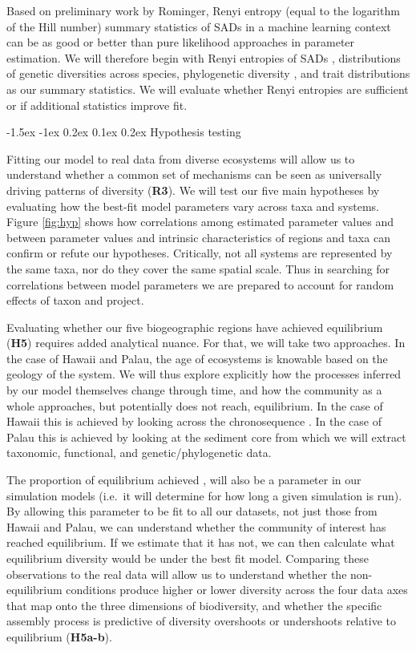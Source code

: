 \documentclass[11pt]{article}
\makeatletter
\renewcommand\subsubsection{\@startsection{subsection}{1}{\z@}%
                                  {-1.5ex \@plus -1ex \@minus 0.2ex}%
                                  {0.1ex \@plus 0.2ex}%
                                  {\normalfont\bfseries}}
\makeatother
\begin{document}
Based on preliminary work by Rominger, Renyi entropy (equal to the
logarithm of the Hill number) summary statistics of SADs in a machine
learning context can be as good or better than pure likelihood
approaches in parameter estimation. We will therefore begin with Renyi
entropies of SADs \cite{May2017-ji}, distributions of genetic
diversities across species, phylogenetic diversity \cite{Chao2010-oo},
and trait distributions as our summary statistics. We will evaluate
whether Renyi entropies are sufficient or if additional statistics
improve fit.

\subsubsection{Hypothesis testing}\label{hypothesis-testing}

Fitting our model to real data from diverse ecosystems will allow us
to understand whether a common set of mechanisms can be seen as
universally driving patterns of diversity (\textbf{R3}). We will test
our five main hypotheses by evaluating how the best-fit model
parameters vary across taxa and systems. Figure \ref{fig:hyp} shows
how correlations among estimated parameter values and between
parameter values and intrinsic characteristics of regions and taxa can
confirm or refute our hypotheses. Critically, not all systems are
represented by the same taxa, nor do they cover the same spatial
scale. Thus in searching for correlations between model parameters we are
prepared to account for random effects of taxon and project.

Evaluating whether our five biogeographic regions have achieved
equilibrium (\textbf{H5}) requires added analytical nuance. For that,
we will take two approaches. In the case of Hawaii and Palau, the age
of ecosystems is knowable based on the geology of the system. We will
thus explore explicitly how the processes inferred by our model
themselves change through time, and how the community as a whole
approaches, but potentially does not reach, equilibrium. In the case
of Hawaii this is achieved by looking across the chronosequence
\cite{Rominger2015-kb}. In the case of Palau this is achieved by
looking at the sediment core from which we will extract taxonomic,
functional, and genetic/phylogenetic data.

The proportion of equilibrium achieved
\citep[sensu][]{Rosindell2013-di}, will also be a parameter in our
simulation models (i.e.~it will determine for how long a given
simulation is run). By allowing this parameter to be fit to all our
datasets, not just those from Hawaii and Palau, we can understand
whether the community of interest has reached equilibrium. If we
estimate that it has not, we can then calculate what equilibrium
diversity would be under the best fit model. Comparing these
observations to the real data will allow us to understand whether the
non-equilibrium conditions produce higher or lower diversity across
the four data axes that map onto the three dimensions of biodiversity,
and whether the specific assembly process is predictive of diversity
overshoots or undershoots relative to equilibrium (\textbf{H5a-b}).
\end{document}
